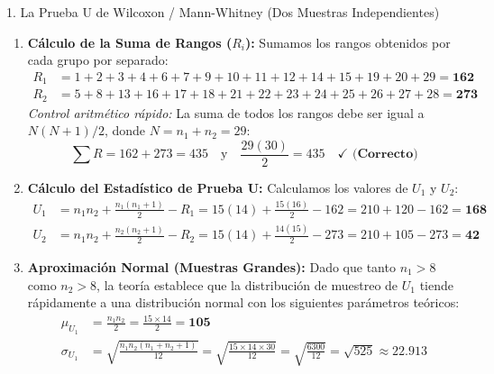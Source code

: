 \documentclass[11pt,a4paper]{article}
\begin{document}
\begin{subsection}{1. La Prueba U de Wilcoxon / Mann-Whitney (Dos Muestras Independientes)}
\begin{enumerate}
\begin{align*}
                  0.89 \text{ (II)} &\rightarrow \text{Rango 22} \quad & 0.92 \text{ (II)} &\rightarrow \text{Rango 23} \quad & 0.96 \text{ (II)} &\rightarrow \text{Rango 24} \\
                  1.01 \text{ (II)} &\rightarrow \text{Rango 25} \quad & 1.07 \text{ (II)} &\rightarrow \text{Rango 26} \quad & 1.11 \text{ (II)} &\rightarrow \text{Rango 27} \\
                  1.13 \text{ (II)} &\rightarrow \text{Rango 28} \quad & 1.36 \text{ (I)} &\rightarrow \text{Rango 29}
              \end{align*}
        \item \textbf{Cálculo de la Suma de Rangos ($R_i$):}
              Sumamos los rangos obtenidos por cada grupo por separado:
              \begin{align*}
                  R_1 &= 1 + 2 + 3 + 4 + 6 + 7 + 9 + 10 + 11 + 12 + 14 + 15 + 19 + 20 + 29 = \mathbf{162} \\
                  R_2 &= 5 + 8 + 13 + 16 + 17 + 18 + 21 + 22 + 23 + 24 + 25 + 26 + 27 + 28 = \mathbf{273}
              \end{align*}
              \textit{Control aritmético rápido:} La suma de todos los rangos debe ser igual a $N(N+1)/2$, donde $N = n_1 + n_2 = 29$:
              \[ \sum R = 162 + 273 = 435 \quad \text{y} \quad \frac{29(30)}{2} = 435 \quad \mathbf{\checkmark \text{ (Correcto)}} \]
        \item \textbf{Cálculo del Estadístico de Prueba U:}
              Calculamos los valores de $U_1$ y $U_2$:
              \begin{align*}
                  U_1 &= n_1 n_2 + \frac{n_1(n_1+1)}{2} - R_1 = 15(14) + \frac{15(16)}{2} - 162 = 210 + 120 - 162 = \mathbf{168} \\
                  U_2 &= n_1 n_2 + \frac{n_2(n_2+1)}{2} - R_2 = 15(14) + \frac{14(15)}{2} - 273 = 210 + 105 - 273 = \mathbf{42}
              \end{align*}
        \item \textbf{Aproximación Normal (Muestras Grandes):}
              Dado que tanto $n_1 > 8$ como $n_2 > 8$, la teoría establece que la distribución de muestreo de $U_1$ tiende rápidamente a una distribución normal con los siguientes parámetros teóricos:
              \begin{align*}
                  \mu_{U_1} &= \frac{n_1 n_2}{2} = \frac{15 \times 14}{2} = \mathbf{105} \\
                  \sigma_{U_1} &= \sqrt{\frac{n_1 n_2 (n_1 + n_2 + 1)}{12}} = \sqrt{\frac{15 \times 14 \times 30}{12}} = \sqrt{\frac{6300}{12}} = \sqrt{525} \approx \mathbf{22.913}

\end{align*}
\end{enumerate}
\end{subsection}
\end{document}
